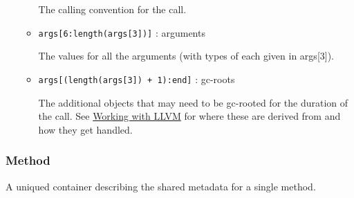 \begin{itemize}
\begin{itemize}
The calling convention for the call.


\item \texttt{args[6:length(args[3])]} : arguments

The values for all the arguments (with types of each given in args[3]).


\item \texttt{args[(length(args[3]) + 1):end]} : gc-roots

The additional objects that may need to be gc-rooted for the duration of the call. See \hyperlink{16487312531471662451}{Working with LLVM} for where these are derived from and how they get handled.

\end{itemize}
\end{itemize}


\hypertarget{10862348325946528961}{}


\subsubsection{Method}



A unique{\textquotesingle}d container describing the shared metadata for a single method.



